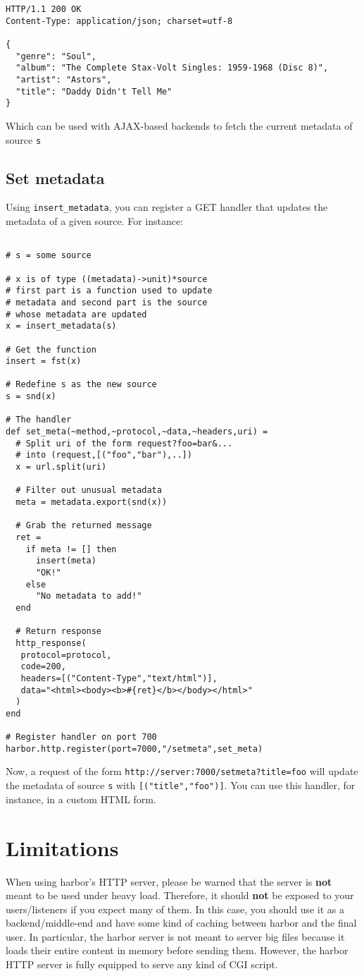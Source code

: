 \begin{verbatim}
HTTP/1.1 200 OK
Content-Type: application/json; charset=utf-8

{
  "genre": "Soul",
  "album": "The Complete Stax-Volt Singles: 1959-1968 (Disc 8)",
  "artist": "Astors",
  "title": "Daddy Didn't Tell Me"
}
\end{verbatim}
Which can be used with AJAX-based backends to fetch the current 
metadata of source \verb+s+

\subsection{Set metadata}
Using \verb+insert_metadata+, you can register a GET handler that
updates the metadata of a given source. For instance:

\begin{verbatim}

# s = some source

# x is of type ((metadata)->unit)*source
# first part is a function used to update
# metadata and second part is the source 
# whose metadata are updated
x = insert_metadata(s)

# Get the function
insert = fst(x)

# Redefine s as the new source
s = snd(x)

# The handler
def set_meta(~method,~protocol,~data,~headers,uri) =
  # Split uri of the form request?foo=bar&...
  # into (request,[("foo","bar"),..])
  x = url.split(uri)

  # Filter out unusual metadata
  meta = metadata.export(snd(x))
  
  # Grab the returned message
  ret =
    if meta != [] then
      insert(meta)
      "OK!"
    else
      "No metadata to add!"
  end

  # Return response
  http_response(
   protocol=protocol,
   code=200,
   headers=[("Content-Type","text/html")],
   data="<html><body><b>#{ret}</b></body></html>"
  )
end

# Register handler on port 700
harbor.http.register(port=7000,"/setmeta",set_meta)
\end{verbatim}
Now, a request of the form \verb+http://server:7000/setmeta?title=foo+
will update the metadata of source \verb+s+ with \verb+[("title","foo")]+. You
can use this handler, for instance, in a custom HTML form.

\section{Limitations}
When using harbor's HTTP server, please be warned that the server is 
\textbf{not} meant to be used under heavy load. Therefore, it should \textbf{not}
be exposed to your users/listeners if you expect many of them. In this
case, you should use it as a backend/middle-end and have some kind of 
caching between harbor and the final user. In particular, the harbor server
is not meant to server big files because it loads their entire content in 
memory before sending them. However, the harbor HTTP server is fully equipped 
to serve any kind of CGI script. 



